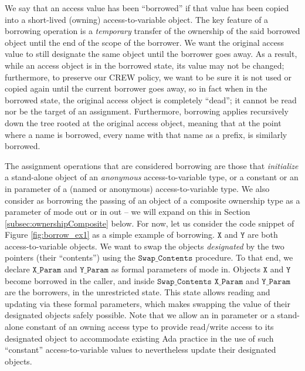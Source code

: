 \documentclass{llncs}
\newcommand\var[1]{\ensuremath{\mathtt{#1}}}
\newcommand{\keyword}[1]{\textsf{#1}}
\begin{document}
We say that an access value has been ``borrowed'' if that value has been copied into a short-lived (owning) access-to-variable  object.
The key feature of a borrowing operation is a \textit{temporary} transfer of the ownership of the said borrowed object until the end of the scope of the borrower.
We want the original access value to still designate the same object until the borrower goes away. As a result, while an access object
is in the borrowed state, its value may not be changed; furthermore, to preserve our CREW policy, we want to be sure it is not used or copied again until the current borrower goes away, so in fact when in the borrowed state, the original access object is completely ``dead''; it cannot
be read nor be the target of an assignment. Furthermore, borrowing applies recursively down the tree rooted at the original access object, meaning that at the point where a name is borrowed,
every name with that name as a prefix, is similarly borrowed.


The assignment operations that are considered borrowing are those that \textit{initialize} a stand-alone object of an \textit{anonymous} access-to-variable type, or a \keyword{constant} or an \keyword{in} parameter of a (named or anonymous) access-to-variable
type.  We also consider as borrowing the passing of an object of a composite ownership type
as a parameter of mode \keyword{out} or \keyword{in out} -- we will expand on this in Section \ref{subsec:ownershipComposite} below. For now, let us consider the
code snippet of Figure \ref{fig:borrow_ex1} as a simple example of borrowing. \var{X} and \var{Y} are both access-to-variable objects. We want to swap the objects \textit{designated} by the two
pointers (their ``contents'') using the \var{Swap\_Contents} procedure. To that end, we declare \var{X\_Param} and \var{Y\_Param} as formal parameters of mode \keyword{in}. Objects \var{X} and \var{Y} become borrowed
in the caller, and inside \var{Swap\_Contents} \var{X\_Param} and \var{Y\_Param} are the borrowers, in the unrestricted state. This state allows reading and updating via these formal parameters, which makes swapping
the value of their designated objects safely possible. Note that we allow an \keyword{in} parameter or a stand-alone constant of an owning access type to provide read/write access to its designated object to accommodate existing Ada practice in the use of such ``constant'' access-to-variable values to nevertheless update their designated objects.
\end{document}
